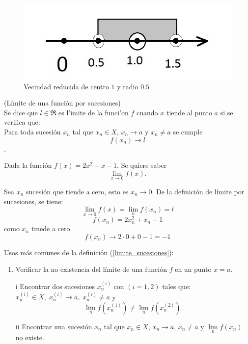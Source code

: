 \documentclass[10pt,twoside]{SelfArx} %
\begin{document}
\begin{figure}[h]
	\centering
	\includegraphics{vecindad_reducida}
	\caption{Vecindad reducida de centro $ 1 $ y radio $ 0.5 $}
	\label{vecindad_im2}
\end{figure}

\begin{thm}\label{limite_sucesiones}
	(Límite de una función por sucesiones)\\
		Se dice que $ l\in\Re $ es l'imite de la funci'on $ f $ cuando $ x $ tiende al punto $ a $ si se verifica que:\\
	Para toda sucesión $ {x_{n}} $	tal que $ x_{n}\in X $, $ x_{n}\rightarrow a $ y $ x_{n}\neq a $ se cumple
	\[ f(x_{n})\rightarrow l \].
\end{thm}


\begin{ejemplo}
	Dada la función $ f(x)=2x^{2}+x-1 $. Se quiere saber \[ \lim\limits_{x\rightarrow0}f(x) .\]
	
	Sea $ {x_{n}} $ sucesión que tiende a cero, esto es $ x_{n}\rightarrow0 $.
	De la definición de límite por sucesiones, se tiene:
\[ \lim\limits_{x\rightarrow0}f(x)=\lim\limits_{n}f(x_{n})=l \]
\[ f(x_{n})=2x_{n}^{2}+x_{n}-1 \]
como $ x_{n} $ tinede a cero
\[ f(x_{n})\rightarrow2\cdot0+0-1=-1 \]

\end{ejemplo}

Usos más comunes de la  definición (\ref{limite_sucesiones}):\\
\begin{enumerate}
	\item Verificar la no existencia del límite de una función $ f $ en un punto $ x=a $.
	\item[i]	Encontrar dos sucesiones $ {x_{n}^{(i)}} $ con $ (i=1,2) $ tales que:$ x_{n}^{(i)}\in X, \; x_{n}^{(i)}\rightarrow a, \; x_{n}^{(i)}\neq a $ y 
	\[ \lim\limits_{n}f(x_{n}^{(1)})\neq\lim\limits_{n}f(x_{n}^{(2)}). \]
	\item[ii]	Encontrar una sucesión $ {x_{n}} $ tal que $ x_{n}\in X $, $ x_{n}\rightarrow a $, $ x_{n}\neq a $ y $ \lim\limits_{n}f(x_{n}) $ no existe.
\end{enumerate}
\end{document}

